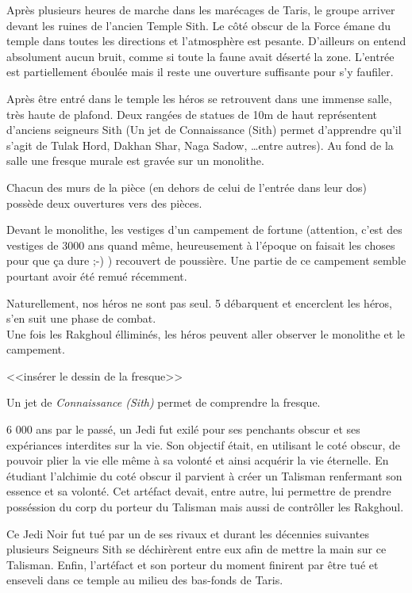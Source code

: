 Après plusieurs heures de marche dans les marécages de Taris, le groupe arriver devant les ruines de l'ancien Temple Sith. Le côté obscur de la Force émane du temple dans toutes les directions et l'atmosphère est pesante. D'ailleurs on entend absolument aucun bruit, comme si toute la faune avait déserté la zone. L'entrée est partiellement éboulée mais il reste une ouverture suffisante pour s'y faufiler.

Après être entré dans le temple les héros se retrouvent dans une immense salle, très haute de plafond. Deux rangées de statues de 10m de haut représentent d'anciens seigneurs Sith (Un jet de Connaissance (Sith) permet d'apprendre qu'il s'agit de Tulak Hord, Dakhan Shar, Naga Sadow, \ldots entre autres). Au fond de la salle une fresque murale est gravée sur un monolithe.

Chacun des murs de la pièce (en dehors de celui de l'entrée dans leur dos) possède deux ouvertures vers des pièces.

Devant le monolithe, les vestiges d'un campement de fortune (attention, c'est des vestiges de 3000 ans quand même, heureusement à l'époque on faisait les choses pour que ça dure ;-) ) recouvert de poussière. Une partie de ce campement semble pourtant avoir été remué récemment.

Naturellement, nos héros ne sont pas seul. 5  débarquent et encerclent les héros, s'en suit une phase de combat.
\\

Une fois les Rakghoul élliminés, les héros peuvent aller observer le monolithe et le campement.

<<insérer le dessin de la fresque>>

Un jet de \emph{Connaissance (Sith)} permet de comprendre la fresque. 

\begin{quotebox}
6 000 ans par le passé, un Jedi fut exilé pour ses penchants obscur et ses expériances interdites sur la vie. Son objectif était, en utilisant le coté obscur, de pouvoir plier la vie elle même à sa volonté et ainsi acquérir la vie éternelle. En étudiant l'alchimie du coté obscur il parvient à créer un Talisman renfermant son essence et sa volonté. Cet artéfact devait, entre autre, lui permettre de prendre posséssion du corp du porteur du Talisman mais aussi de contrôller les Rakghoul.

Ce Jedi Noir fut tué par un de ses rivaux et durant les décennies suivantes plusieurs Seigneurs Sith se déchirèrent entre eux afin de mettre la main sur ce Talisman. Enfin, l'artéfact et son porteur du moment finirent par être tué et enseveli dans ce temple au milieu des bas-fonds de Taris.
\end{quotebox}

